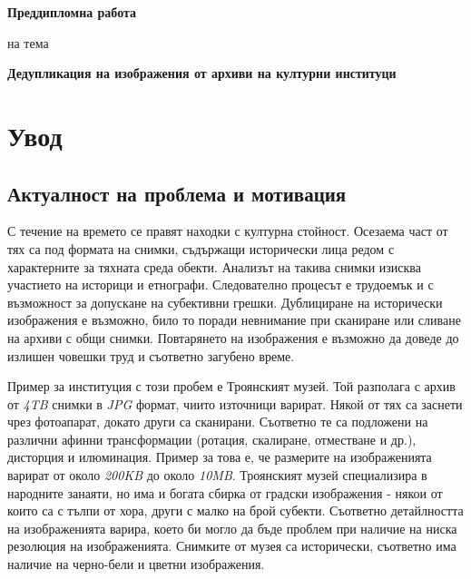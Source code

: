 \documentclass[a4paper,12pt]{article}
\begin{document}
\maketitle
\begin{center}\textbf{Преддипломна работа}\end{center}

\begin{center}на тема\end{center}

\begin{center}\textbf{Дедупликация на изображения от архиви на културни институци}\end{center}

\pagebreak

\section{Увод}

\subsection{Актуалност на проблема и мотивация}

С течение на времето се правят находки с културна стойност. Осезаема част от тях са под формата на снимки, съдържащи исторически лица редом с характерните за тяхната среда обекти. Анализът на такива снимки изисква участието на историци и етнографи. Следователно процесът е трудоемък и с възможност за допускане на субективни грешки. Дублициране на исторически изображения е възможно, било то поради невнимание при сканиране или сливане на архиви с общи снимки. Повтарянето на изображения е възможно да доведе до излишен човешки труд и съответно загубено време.

\bigbreak

Пример за институция с този пробем е Троянският музей. Той разполага с архив от \textit{4TB} снимки в \textit{JPG} формат, чиито източници варират. Някой от тях са заснети чрез фотоапарат, докато други са сканирани. Съответно те са подложени на различни афинни трансформации (ротация, скалиране, отместване и др.), дисторция и илюминация. Пример за това е, че размерите на изображенията варират от около \textit{200KB} до около \textit{10MB}. Троянският музей специализира в народните занаяти, но има и богата сбирка от градски изображения - някои от които са с тълпи от хора, други с малко на брой субекти. Съответно детайлността на изображенията варира, което би могло да бъде проблем при наличие на ниска резолюция на изображенията. Снимките от музея са исторически, съответно има наличие на черно-бели и цветни изображения.
\end{document}
